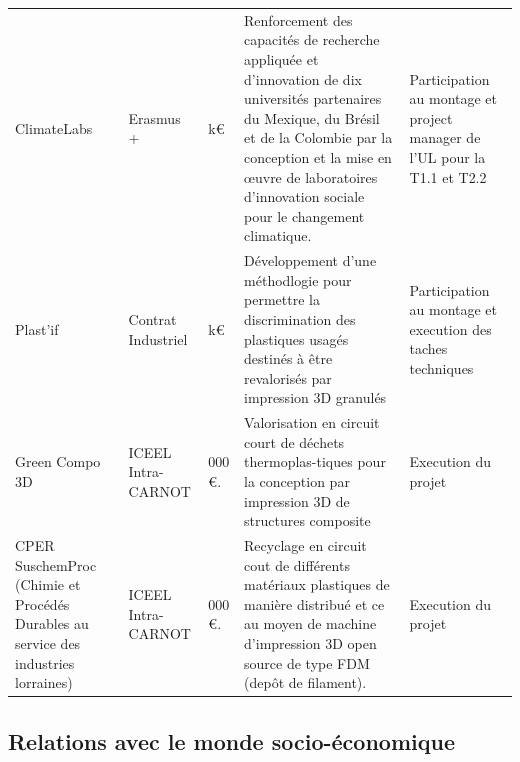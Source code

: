 \documentclass[
  11pt,
]{article}
\begin{document}
\begin{landscape}
\begin{longtable}[t]{>{\raggedright\arraybackslash}p{4cm}>{\raggedright\arraybackslash}p{3cm}>{\raggedright\arraybackslash}p{2cm}>{\raggedright\arraybackslash}p{7cm}>{\raggedright\arraybackslash}p{3cm}}
ClimateLabs & Erasmus + & 14 k€ & Renforcement des capacités de recherche appliquée et d'innovation de dix universités partenaires du Mexique, du Brésil et de la Colombie par la conception et la mise en œuvre de laboratoires d'innovation sociale pour le changement climatique. & Participation au montage et project manager de l'UL pour la T1.1 et T2.2\\
Plast’if & Contrat Industriel & 11 k€ & Développement d'une méthodlogie pour permettre la discrimination des plastiques usagés destinés à être revalorisés par impression 3D granulés & Participation au montage et execution des taches techniques\\
Green Compo 3D & ICEEL Intra-CARNOT & 14 000 €. & Valorisation en circuit court de déchets thermoplas-tiques pour la conception par impression 3D de structures composite & Execution du projet\\
CPER SuschemProc (Chimie et Procédés Durables au service des industries lorraines) & ICEEL Intra-CARNOT & 44 000 €. & Recyclage en circuit cout de différents matériaux plastiques de manière distribué et ce au moyen de machine d’impression 3D open source de type FDM (depôt de filament). & Execution du projet\\
\bottomrule
\end{longtable}
\endgroup{}
\end{landscape}

\hypertarget{relations-avec-le-monde-socio-uxe9conomique}{%
\subsection{Relations avec le monde
socio-économique}\label{relations-avec-le-monde-socio-uxe9conomique}}
\end{document}
